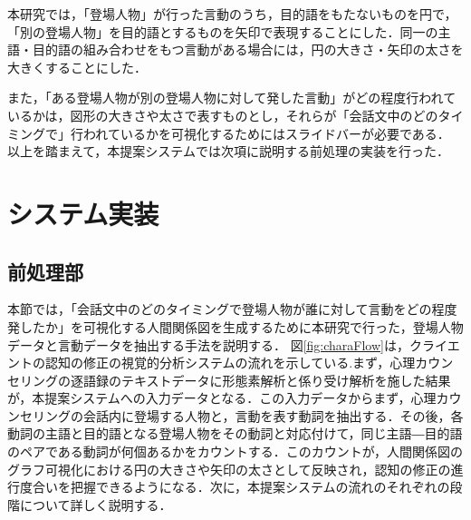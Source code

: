 \documentclass[shuuron]{kuee}
\begin{document}
本研究では，「登場人物」が行った言動のうち，目的語をもたないものを円で，「別の登場人物」を目的語とするものを矢印で表現することにした．同一の主語・目的語の組み合わせをもつ言動がある場合には，円の大きさ・矢印の太さを大きくすることにした．

また，「ある登場人物が別の登場人物に対して発した言動」がどの程度行われているかは，図形の大きさや太さで表すものとし，それらが「会話文中のどのタイミングで」行われているかを可視化するためにはスライドバーが必要である．
以上を踏まえて，本提案システムでは次項に説明する前処理の実装を行った．







\section{システム実装} %

\subsection{前処理部} %


本節では，「会話文中のどのタイミングで登場人物が誰に対して言動をどの程度発したか」を可視化する人間関係図を生成するために本研究で行った，登場人物データと言動データを抽出する手法を説明する．%
図\ref{fig:charaFlow}は，クライエントの認知の修正の視覚的分析システムの流れを示している.まず，心理カウンセリングの逐語録のテキストデータに形態素解析と係り受け解析を施した結果が，本提案システムへの入力データとなる．この入力データからまず，心理カウンセリングの会話内に登場する人物と，言動を表す動詞を抽出する．その後，各動詞の主語と目的語となる登場人物をその動詞と対応付けて，同じ主語―目的語のペアである動詞が何個あるかをカウントする．このカウントが，人間関係図のグラフ可視化における円の大きさや矢印の太さとして反映され，認知の修正の進行度合いを把握できるようになる．次に，本提案システムの流れのそれぞれの段階について詳しく説明する．
\end{document}
